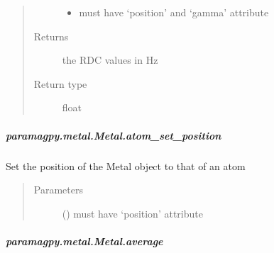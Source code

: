 \documentclass[a4paper,10pt,english,openany,oneside]{sphinxmanual}
\begin{document}
\begin{fulllineitems}
\begin{fulllineitems}
\begin{fulllineitems}
\begin{quote}
\begin{description}
\begin{itemize}
\item {} 
 \textendash{} must have ‘position’ and ‘gamma’ attribute

\end{itemize}

\item[{Returns}] \leavevmode
{} \textendash{} the RDC values in Hz

\item[{Return type}] \leavevmode
float

\end{description}\end{quote}

\end{fulllineitems}



\subparagraph{paramagpy.metal.Metal.atom\_set\_position}
\label{\detokenize{reference/generated/paramagpy.metal.Metal.atom_set_position:paramagpy-metal-metal-atom-set-position}}\label{\detokenize{reference/generated/paramagpy.metal.Metal.atom_set_position::doc}}

\begin{fulllineitems}
\label{\detokenize{reference/generated/paramagpy.metal.Metal.atom_set_position:paramagpy.metal.Metal.atom_set_position}}
Set the position of the Metal object to that of an atom
\begin{quote}\begin{description}
\item[{Parameters}] \leavevmode
{} () \textendash{} must have ‘position’ attribute

\end{description}\end{quote}

\end{fulllineitems}



\subparagraph{paramagpy.metal.Metal.average}
\label{\detokenize{reference/generated/paramagpy.metal.Metal.average:paramagpy-metal-metal-average}}\label{\detokenize{reference/generated/paramagpy.metal.Metal.average::doc}}


\end{fulllineitems}
\end{fulllineitems}
\end{document}
